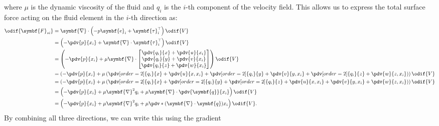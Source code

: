 \documentclass{article}
\theoremstyle{definition}
\begin{document}
where \(\mu\) is the dynamic viscosity of the fluid and \(q_i\) is the
\(i\)-th component of the velocity field. This allows us to express the
total surface force acting on the fluid element in the \(i\)-th
direction as:
\begin{align*}
    \odif{\symbf{F}_{si}} & = \symbf{\nabla} \cdot \left( -p \symbf{e}_i + \symbf{\tau}_i^\top \right) \odif{V}                                                  \\
                          & = \left( - \pdv{p}{x_i} + \symbf{\nabla} \cdot \symbf{\tau}_i^\top \right) \odif{V}                                                  \\
                          & = \left( - \pdv{p}{x_i} + \mu \symbf{\nabla} \cdot
    \begin{bmatrix}
        \displaystyle \pdv{q_i}{x} + \pdv{u}{x_i} \\
        \displaystyle \pdv{q_i}{y} + \pdv{v}{x_i} \\
        \displaystyle \pdv{q_i}{z} + \pdv{w}{x_i}
    \end{bmatrix}
    \right) \odif{V}                                                                                                                                             \\
                          & = \left( - \pdv{p}{x_i} + \mu \left(
        \pdv[order=2]{q_i}{x} + \pdv{u}{x,x_i} +
        \pdv[order=2]{q_i}{y} + \pdv{v}{y,x_i} +
        \pdv[order=2]{q_i}{z} + \pdv{w}{z,x_i}
    \right) \right) \odif{V}                                                                                                                                     \\
                          & = \left( - \pdv{p}{x_i} + \mu \left(
        \pdv[order=2]{q_i}{x} + \pdv[order=2]{q_i}{y} + \pdv[order=2]{q_i}{z} +
        \pdv{u}{x,x_i} + \pdv{v}{y,x_i} + \pdv{w}{z,x_i}
    \right) \right) \odif{V}                                                                                                                                     \\
                          & = \left( - \pdv{p}{x_i} + \mu \symbf{\nabla}^2 q_i + \mu \symbf{\nabla} \cdot \pdv{\symbf{q}}{x_i} \right) \odif{V}                  \\
                          & = \left( - \pdv{p}{x_i} + \mu \symbf{\nabla}^2 q_i + \mu \pdv*{\left( \symbf{\nabla} \cdot \symbf{q} \right)}{x_i} \right) \odif{V}.
\end{align*}
By combining all three directions, we can write this using the gradient
\end{document}
